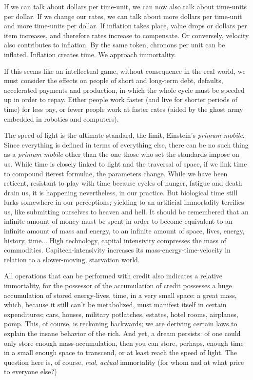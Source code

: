 If we can talk about dollars per time-unit, we can now also talk about time-units per dollar. If we change our rates, we can talk about more dollars per time-unit and more time-units per dollar. If inflation takes place, value drops or dollars per item increases, and therefore rates increase to compensate. Or conversely, velocity also contributes to inflation. By the same token, chronons per unit can be inflated. Inflation creates time. We approach immortality.

If this seems like an intellectual game, without consequence in the real world, we must consider the effects on people of short and long-term debt, defaults, accelerated payments and production, in which the whole cycle must be speeded up in order to repay. Either people work faster (and live for shorter periods of time) for less pay, or fewer people work at faster rates (aided by the ghost army embedded in robotics and computers).

The speed of light is the ultimate standard, the limit, Einstein's \emph{primum mobile}. Since everything is defined in terms of everything else, there can be no such thing as a \emph{primum mobile} other than the one those who set the standards impose on us. While time is closely linked to light and the traversal of space, if we link time to compound iterest formulae, the parameters change. While we have been reticent, resistant to play with time because cycles of hunger, fatigue and death drain us, it is happening nevertheless, in our practice. But biological time still lurks somewhere in our perceptions; yielding to an artificial immortality terrifies us, like submitting ourselves to heaven and hell. It should be remembered that an infinite amount of money must be spent in order to become equivalent to an infinite amount of mass and energy, to an infinite amount of space, lives, energy, history, time... High technology, capital intensivity compresses the mass of commodities. Capitech-intensivity increases its mass-energy-time-velocity in relation to a slower-moving, starvation world.

All operations that can be performed with credit also indicates a relative immortality, for the possessor of the accumulation of credit possesses a huge accumulation of stored energy-lives, time, in a very small space: a great mass, which, because it still can't be metabolized, must manifest itself in certain expenditures; cars, houses, military potlatches, estates, hotel rooms, airplanes, pomp. This, of course, is reckoning backwards; we are deriving certain laws to explain the insane behavior of the rich. And yet, a dream persists: of one could only store enough mass-accumulation, then you can store, perhaps, enough time in a small enough space to transcend, or at least reach the speed of light. The question here is, of course, \emph{real}, \emph{actual} immortality (for whom and at what price to everyone else?)

